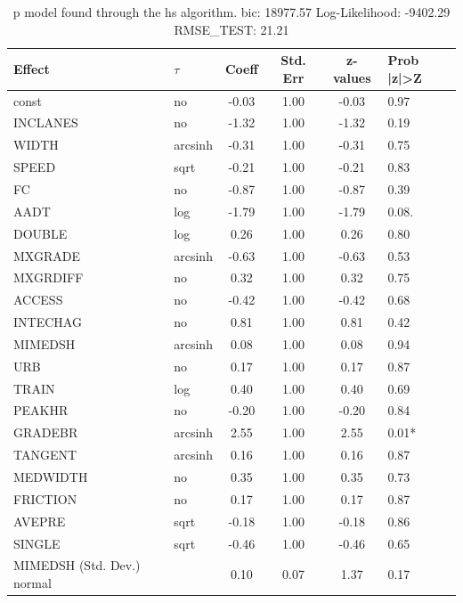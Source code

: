 \begin{table}
	\caption{p model found through the hs algorithm. bic: 18977.57 Log-Likelihood: -9402.29 RMSE_TEST: 21.21}
	\begin{center}
		\begin{tabular}{|l|l|c|c|c|l|}
			\hline
			Effect & $\tau$ & Coeff & Std. Err & z-values & Prob |z|>Z \\
			\hline
			const & no & -0.03 & 1.00 & -0.03 & 0.97 \\
			\hline
			INCLANES & no & -1.32 & 1.00 & -1.32 & 0.19 \\
			\hline
			WIDTH & arcsinh & -0.31 & 1.00 & -0.31 & 0.75 \\
			\hline
			SPEED & sqrt & -0.21 & 1.00 & -0.21 & 0.83 \\
			\hline
			FC & no & -0.87 & 1.00 & -0.87 & 0.39 \\
			\hline
			AADT & log & -1.79 & 1.00 & -1.79 & 0.08. \\
			\hline
			DOUBLE & log & 0.26 & 1.00 & 0.26 & 0.80 \\
			\hline
			MXGRADE & arcsinh & -0.63 & 1.00 & -0.63 & 0.53 \\
			\hline
			MXGRDIFF & no & 0.32 & 1.00 & 0.32 & 0.75 \\
			\hline
			ACCESS & no & -0.42 & 1.00 & -0.42 & 0.68 \\
			\hline
			INTECHAG & no & 0.81 & 1.00 & 0.81 & 0.42 \\
			\hline
			MIMEDSH & arcsinh & 0.08 & 1.00 & 0.08 & 0.94 \\
			\hline
			URB & no & 0.17 & 1.00 & 0.17 & 0.87 \\
			\hline
			TRAIN & log & 0.40 & 1.00 & 0.40 & 0.69 \\
			\hline
			PEAKHR & no & -0.20 & 1.00 & -0.20 & 0.84 \\
			\hline
			GRADEBR & arcsinh & 2.55 & 1.00 & 2.55 & 0.01* \\
			\hline
			TANGENT & arcsinh & 0.16 & 1.00 & 0.16 & 0.87 \\
			\hline
			MEDWIDTH & no & 0.35 & 1.00 & 0.35 & 0.73 \\
			\hline
			FRICTION & no & 0.17 & 1.00 & 0.17 & 0.87 \\
			\hline
			AVEPRE & sqrt & -0.18 & 1.00 & -0.18 & 0.86 \\
			\hline
			SINGLE & sqrt & -0.46 & 1.00 & -0.46 & 0.65 \\
			\hline
			MIMEDSH (Std. Dev.) normal &  & 0.10 & 0.07 & 1.37 & 0.17 \\
			\hline

\end{tabular}
\end{center}
\end{table}

